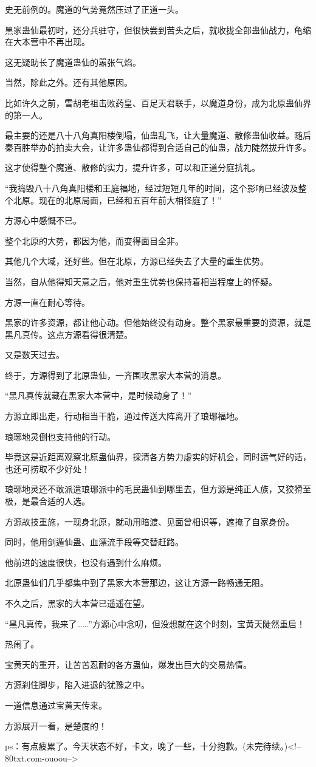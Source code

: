 \begin{this_body}
史无前例的。魔道的气势竟然压过了正道一头。

黑家蛊仙最初时，还分兵驻守，但很快尝到苦头之后，就收拢全部蛊仙战力，龟缩在大本营中不再出现。

这无疑助长了魔道蛊仙的嚣张气焰。

当然，除此之外。还有其他原因。

比如许久之前，雪胡老祖击败药皇、百足天君联手，以魔道身份，成为北原蛊仙界的第一人。

最主要的还是八十八角真阳楼倒塌，仙蛊乱飞，让大量魔道、散修蛊仙收益。随后秦百胜举办的拍卖大会，让许多蛊仙都得到合适自己的仙蛊，战力陡然拔升许多。

这才使得整个魔道、散修的实力，提升许多，可以和正道分庭抗礼。

“我捣毁八十八角真阳楼和王庭福地，经过短短几年的时间，这个影响已经波及整个北原。现在的北原局面，已经和五百年前大相径庭了！”

方源心中感慨不已。

整个北原的大势，都因为他，而变得面目全非。

其他几个大域，还好些。但在北原，方源已经失去了大量的重生优势。

当然，自从他得知天意之后，他对重生优势也保持着相当程度上的怀疑。

方源一直在耐心等待。

黑家的许多资源，都让他心动。但他始终没有动身。整个黑家最重要的资源，就是黑凡真传。这点方源看得很清楚。

又是数天过去。

终于，方源得到了北原蛊仙，一齐围攻黑家大本营的消息。

“黑凡真传就藏在黑家大本营中，是时候动身了！”

方源立即出走，行动相当干脆，通过传送大阵离开了琅琊福地。

琅琊地灵倒也支持他的行动。

毕竟这是近距离观察北原蛊仙界，探清各方势力虚实的好机会，同时运气好的话，也还可捞取不少好处！

琅琊地灵还不敢派遣琅琊派中的毛民蛊仙到哪里去，但方源是纯正人族，又狡猾至极，是最合适的人选。

方源故技重施，一现身北原，就动用暗渡、见面曾相识等，遮掩了自家身份。

同时，他用剑遁仙蛊、血漂流手段等交替赶路。

他前进的速度很快，也没有遇到什么麻烦。

北原蛊仙们几乎都集中到了黑家大本营那边，这让方源一路畅通无阻。

不久之后，黑家的大本营已遥遥在望。

“黑凡真传，我来了……”方源心中念叨，但没想就在这个时刻，宝黄天陡然重启！

热闹了。

宝黄天的重开，让苦苦忍耐的各方蛊仙，爆发出巨大的交易热情。

方源刹住脚步，陷入进退的犹豫之中。

一道信息通过宝黄天传来。

方源展开一看，是楚度的！

ps：有点疲累了。今天状态不好，卡文，晚了一些，十分抱歉。(未完待续。)<!--80txt.com-ouoou-->

\end{this_body}

